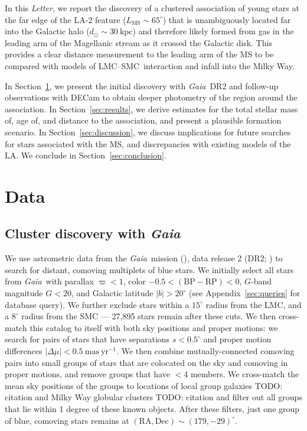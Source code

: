 \documentclass[modern]{aastex62}
\newcommand{\acronym}[1]{{\small{#1}}}
\newcommand{\gaia}{\textsl{Gaia}}
\newcommand{\DR}[1]{\acronym{DR#1}}
\newcommand{\todo}[1]{{\color{red} TODO: #1}}
\newcommand{\articlename}{\textsl{Letter}}
\newcommand{\sectionname}{Section}
\newcommand{\masyr}{\ensuremath{\textrm{mas}~\textrm{yr}^{-1}}}
\newcommand{\lmcsmc}{LMC--SMC}
\newcommand{\bprp}{\ensuremath{\textrm{BP} - \textrm{RP}}}
\begin{document}
In this \articlename, we report the discovery of a clustered association of young stars at the far edge of the LA-2 feature ($L_{\textrm{MS}} \sim 65^\circ$) that is unambiguously located far into the Galactic halo ($d_\odot \sim 30~\textrm{kpc}$) and therefore likely formed from gas in the leading arm of the Magellanic stream as it crossed the Galactic disk.
This provides a clear distance measurement to the leading arm of the MS to be compared with models of \lmcsmc\ interaction and infall into the Milky Way.

In \sectionname~\ref{sec:data}, we present the initial discovery with \gaia\ \DR{2} and follow-up observations with DECam to obtain deeper photometry of the region around the association.
In \sectionname~\ref{sec:results}, we derive estimates for the total stellar mass of, age of, and distance to the association, and present a plausible formation scenario.
In \sectionname~\ref{sec:discussion}, we discuss implications for future searches for stars associated with the MS, and discrepancies with existing models of the LA.
We conclude in \sectionname~\ref{sec:conclusion}.

\section{Data} \label{sec:data}

\subsection{Cluster discovery with \gaia}
\label{sec:discovery}

We use astrometric data from the \gaia\ mission (\citealt{Prusti:2016}), data release 2 (\DR{2}; \citealt{Gaia-Collaboration:2018, Lindegren:2018}) to search for distant, comoving multiplets of blue stars.
We initially select all stars from \gaia\ with parallax $\varpi < 1$, color $-0.5 < (\bprp) < 0$, $G$-band magnitude $G < 20$, and Galactic latitude $|b| > 20^\circ$ (see Appendix~\ref{sec:queries} for database query).
We further exclude stars within a $15^\circ$ radius from the LMC, and a $8^\circ$ radius from the SMC --- 27,895 stars remain after these cuts.
We then cross-match this catalog to itself with both sky positions and proper motions: we search for pairs of stars that have separations $s < 0.5^\circ$ and proper motion differences $|\Delta \mu| < 0.5~\masyr$.
We then combine mutually-connected comoving pairs into small groups of stars that are colocated on the sky and comoving in proper motions, and remove groups that have $<4$ members.
We cross-match the mean sky positions of the groups to locations of local group galaxies \todo{citation} \citep{Mcconaghie} and Milky Way globular clusters \todo{citation} \citep{Harris} and filter out all groups that lie within 1 degree of these known objects.
After these filters, just one group of blue, comoving stars remains at $(\textrm{RA}, \textrm{Dec}) \sim (179, -29)^\circ$.
\end{document}

